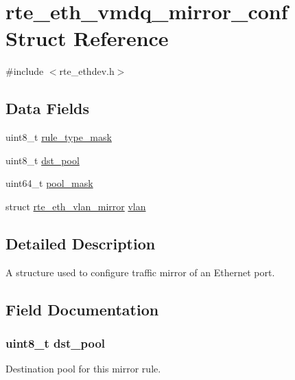 \hypertarget{structrte__eth__vmdq__mirror__conf}{}\section{rte\+\_\+eth\+\_\+vmdq\+\_\+mirror\+\_\+conf Struct Reference}
\label{structrte__eth__vmdq__mirror__conf}


{\ttfamily \#include $<$rte\+\_\+ethdev.\+h$>$}

\subsection*{Data Fields}
\begin{DoxyCompactItemize}
\item 
uint8\+\_\+t \hyperlink{structrte__eth__vmdq__mirror__conf_a83a5601a886010764654d3b6f8a24a7b}{rule\+\_\+type\+\_\+mask}
\item 
uint8\+\_\+t \hyperlink{structrte__eth__vmdq__mirror__conf_a5b3ab73e651d85a122b096b071167119}{dst\+\_\+pool}
\item 
uint64\+\_\+t \hyperlink{structrte__eth__vmdq__mirror__conf_a0133281e4371f5407722d87924bd0059}{pool\+\_\+mask}
\item 
struct \hyperlink{structrte__eth__vlan__mirror}{rte\+\_\+eth\+\_\+vlan\+\_\+mirror} \hyperlink{structrte__eth__vmdq__mirror__conf_aa74cbc3329978599b6eed8e89a7f151b}{vlan}
\end{DoxyCompactItemize}


\subsection{Detailed Description}
A structure used to configure traffic mirror of an Ethernet port. 

\subsection{Field Documentation}
\hypertarget{structrte__eth__vmdq__mirror__conf_a5b3ab73e651d85a122b096b071167119}{}
\subsubsection[{dst\+\_\+pool}]{\setlength{\rightskip}{0pt plus 5cm}uint8\+\_\+t dst\+\_\+pool}\label{structrte__eth__vmdq__mirror__conf_a5b3ab73e651d85a122b096b071167119}
Destination pool for this mirror rule. \hypertarget{structrte__eth__vmdq__mirror__conf_a0133281e4371f5407722d87924bd0059}{}
